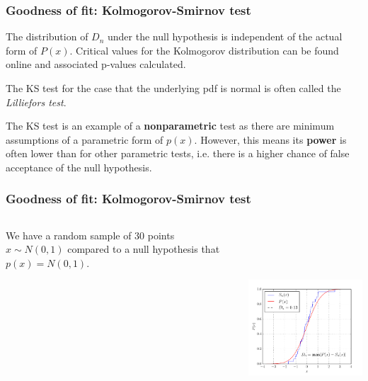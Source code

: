 \begin{frame}

\frametitle{Goodness of fit: Kolmogorov-Smirnov test}
\label{goodnessoffit:kolmogorov-smirnovtest}

The distribution of $D_n$ under the null hypothesis is independent of the actual form of $P(x)$. Critical values
for the Kolmogorov distribution can be found online and associated p-values calculated.

The KS test for the case that the underlying pdf is normal is often called the \emph{Lilliefors test}.

The KS test is an example of a \textbf{nonparametric} test as there are minimum assumptions of a parametric form
of $p(x)$. However, this means its \textbf{power} is often lower than for other parametric tests, i.e. there is a
higher chance of false acceptance of the null hypothesis.

\end{frame}

\begin{frame}

\frametitle{Goodness of fit: Kolmogorov-Smirnov test}
\label{goodnessoffit:kolmogorov-smirnovtest}

\begin{columns}
    \begin{column}{0.3\textwidth}

We have a random sample of $30$ points $x \sim N(0,1)$ compared to a null hypothesis that $p(x) = N(0,1)$.
\end{column}
    \begin{column}{0.7\textwidth}
\includegraphics[keepaspectratio,width=\textwidth,height=210pt]{figures/kstest.pdf}
\end{column}
\end{columns}

\end{frame}

